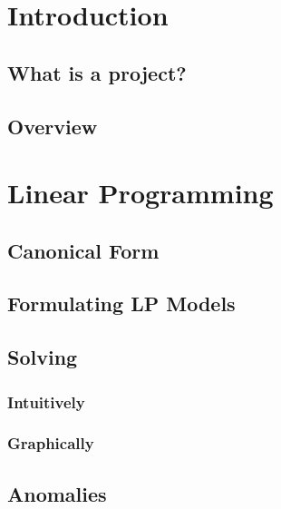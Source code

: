 \chapter{Introduction} %

	\section{What is a project?} %

	\section{Overview} %

\chapter{Linear Programming} %

	\section{Canonical Form} %

	\section{Formulating LP Models} %

	\section{Solving} %

		\subsection{Intuitively} %

		\subsection{Graphically} %

	\section{Anomalies} %

